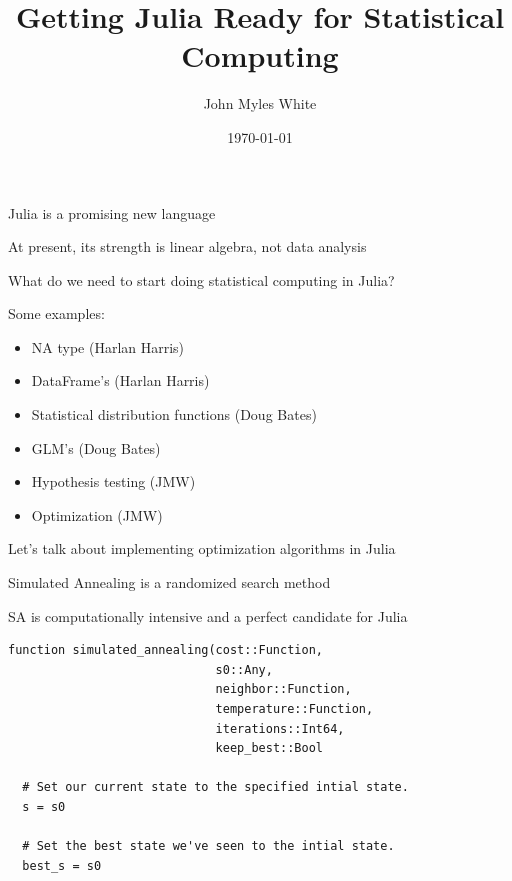 \documentclass{beamer}
\title{Getting Julia Ready for Statistical Computing}
\author{John Myles White}
\date{\today}
\begin{document}
\frame{\titlepage}

\frame
{
	\begin{center}
		Julia is a promising new language
	\end{center}
}

\frame
{
	\begin{center}
		At present, its strength is linear algebra, not data analysis
	\end{center}
}

\frame
{
	\begin{center}
		What do we need to start doing statistical computing in Julia?
	\end{center}
}

\frame
{
	Some examples:
	\begin{itemize}
		\item<1->{NA type (Harlan Harris)}
		\item<2->{DataFrame's (Harlan Harris)}
		\item<3->{Statistical distribution functions (Doug Bates)}
		\item<4->{GLM's (Doug Bates)}
		\item<5->{Hypothesis testing (JMW)}
		\item<6->{Optimization (JMW)}
	\end{itemize}
}

\frame
{
	\begin{center}
		 Let's talk about implementing optimization algorithms in Julia
	\end{center}
}

\frame
{
	\begin{center}
		Simulated Annealing is a randomized search method
	\end{center}
}

\frame
{
	\begin{center}
		SA is computationally intensive and a perfect candidate for Julia
	\end{center}
}

\begin{frame}[fragile]
	\begin{verbatim}
function simulated_annealing(cost::Function,
                             s0::Any,
                             neighbor::Function,
                             temperature::Function,
                             iterations::Int64,
                             keep_best::Bool
                             
  # Set our current state to the specified intial state.
  s = s0

  # Set the best state we've seen to the intial state.
  best_s = s0
	\end{verbatim}
\end{frame}
\end{document}
